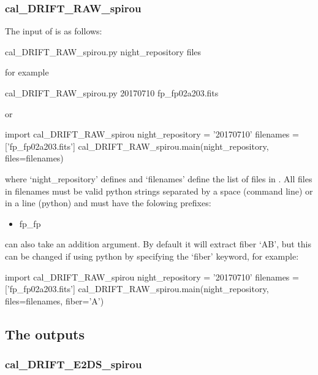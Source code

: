 
\subsubsection{cal\_DRIFT\_RAW\_spirou}

The input of \calDRIFTRAW is as follows:
\begin{cmdbox}
cal_DRIFT_RAW_spirou.py night_repository files
\end{cmdbox}
\noindent for example
\begin{cmdbox}[title={example}]
cal_DRIFT_RAW_spirou.py 20170710 fp_fp02a203.fits
\end{cmdbox}
\noindent or
\begin{pythonbox}
import cal_DRIFT_RAW_spirou
night_repository = '20170710'
filenames = ['fp_fp02a203.fits']
cal_DRIFT_RAW_spirou.main(night_repository, files=filenames)
\end{pythonbox}

\noindent where `night\_repository' defines \argnightname and `filenames' define the list of files in \argfilenames. All files in filenames must be valid python strings separated by a space (command line) or in a line (python) and must have the folowing prefixes:
\begin{itemize}
	\item fp\_fp
\end{itemize}

\begin{note}
\calDRIFTRAW can also take an addition argument. By default it will extract fiber `AB', but this can be changed if using python by specifying the `fiber' keyword, for example:
\begin{pythonbox}
import cal_DRIFT_RAW_spirou
night_repository = '20170710'
filenames = ['fp_fp02a203.fits']
cal_DRIFT_RAW_spirou.main(night_repository, files=filenames, fiber='A')
\end{pythonbox}
\end{note}

\subsection{The outputs}

\subsubsection{cal\_DRIFT\_E2DS\_spirou}

